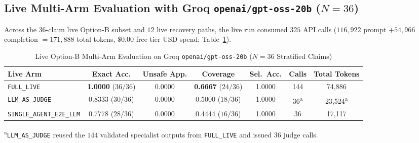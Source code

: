 \documentclass[11pt,a4paper]{article}
\begin{document}
\subsection{Live Multi-Arm Evaluation with Groq \texttt{openai/gpt-oss-20b} ($N=36$)}
Across the $36$-claim live Option-B subset and $12$ live recovery paths, the live run consumed $325$ API calls ($116{,}922$ prompt $+ 54{,}966$ completion $= 171{,}888$ total tokens, $\$0.00$ free-tier USD spend; Table~\ref{tab:live-arms}).

\begin{table}[t]
\centering
\caption{Live Option-B Multi-Arm Evaluation on Groq \texttt{openai/gpt-oss-20b} ($N=36$ Stratified Claims)}
\label{tab:live-arms}
\small
\begin{tabular}{@{}lcccccc@{}}
\toprule
\textbf{Live Arm} & \textbf{Exact Acc.} & \textbf{Unsafe App.} & \textbf{Coverage} & \textbf{Sel.\ Acc.} & \textbf{Calls} & \textbf{Total Tokens} \\
\midrule
\texttt{FULL\_LIVE}            & \textbf{1.0000} ($36/36$) & 0.0000 & \textbf{0.6667} ($24/36$) & 1.0000 & 144 & 74{,}886 \\
\texttt{LLM\_AS\_JUDGE}        & 0.8333 ($30/36$)          & 0.0000 & 0.5000 ($18/36$)          & 1.0000 & 36\textsuperscript{a} & 23{,}524\textsuperscript{a} \\
\texttt{SINGLE\_AGENT\_E2E\_LLM} & 0.7778 ($28/36$)        & 0.0000 & 0.4444 ($16/36$)          & 1.0000 & 36  & 17{,}117 \\
\bottomrule
\end{tabular}

\vspace{2pt}
\footnotesize{\textsuperscript{a}\texttt{LLM\_AS\_JUDGE} reused the $144$ validated specialist outputs from \texttt{FULL\_LIVE} and issued $36$ judge calls.}
\end{table}
\end{document}
